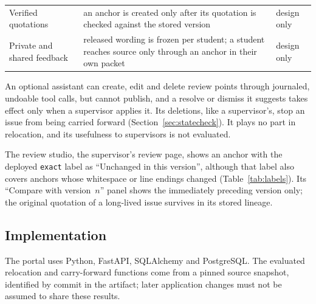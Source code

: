 \begin{table}[t]
\begin{tabular}{@{}p{}p{}p{}@{}}
Verified quotations & an anchor is created only after its quotation is checked against the stored version & design only \\
Private and shared feedback & released wording is frozen per student; a student reaches source only through an anchor in their own packet & design only \\ \bottomrule
\end{tabular}
\end{table}

An optional assistant can create, edit and delete review points through journaled, undoable tool calls, but cannot publish, and a resolve or dismiss it suggests takes effect only when a supervisor applies it. Its deletions, like a supervisor's, stop an issue from being carried forward (Section~\ref{sec:statecheck}). It plays no part in relocation, and its usefulness to supervisors is not evaluated.

The review studio, the supervisor's review page, shows an anchor with the deployed \texttt{exact} label as ``Unchanged in this version'', although that label also covers  anchors whose whitespace or line endings changed (Table~\ref{tab:labels}). Its ``Compare with version~$n$'' panel shows the immediately preceding version only; the original quotation of a long-lived issue survives in its stored lineage.

\subsection{Implementation}
The portal uses Python, FastAPI, SQLAlchemy and PostgreSQL. The evaluated relocation and carry-forward functions come from a pinned source snapshot, identified by commit in the artifact; later application changes must not be assumed to share these results.
